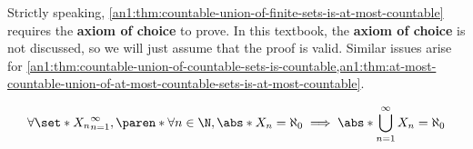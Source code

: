 \begin{remark}
  Strictly speaking, \cref{an1:thm:countable-union-of-finite-sets-is-at-most-countable} requires the
  \textbf{axiom of choice} to prove. In this textbook, the \textbf{axiom of choice} is not discussed,
  so we will just assume that the proof is valid. Similar issues arise for
  \cref{an1:thm:countable-union-of-countable-sets-is-countable,an1:thm:at-most-countable-union-of-at-most-countable-sets-is-at-most-countable}.
\end{remark}

\begin{theorem} \label{an1:thm:countable-union-of-countable-sets-is-countable}
  \[
    \forall \set*{X_{n}}_{n = 1}^{\infty},
    \paren*{\forall n \in \N, \abs*{X_{n}} = \aleph_{0}}
    \implies \abs*{\bigcup_{n = 1}^{\infty} X_{n}} = \aleph_{0}
  \]
\end{theorem}
